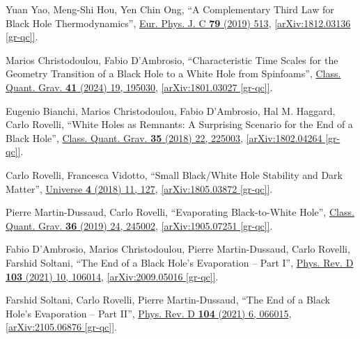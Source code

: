 \documentclass[preprintnumbers, floatfix, preprintnumbers, letterpaper, twocolumn, superscriptaddress,nofootinbib]{revtex4-2}
\begin{document}
\begin{thebibliography}{99}
Yuan Yao, Meng-Shi Hou, Yen Chin Ong, ``A Complementary Third Law for Black Hole Thermodynamics'', 	{\hypersetup{urlcolor=vividviolet}\href{https://link.springer.com/article/10.1140/epjc/s10052-019-7003-1}{Eur. Phys. J. C \textbf{79} (2019) 513}}, \href{https://arxiv.org/abs/1812.03136}{[arXiv:1812.03136 [gr-qc]]}.

Marios Christodoulou, Fabio D'Ambrosio, ``Characteristic Time Scales for the Geometry Transition of a Black Hole to a White Hole from Spinfoams'', {\hypersetup{urlcolor=vividviolet}\href{https://iopscience.iop.org/article/10.1088/1361-6382/ad6059}{Class. Quant. Grav. \textbf{41} (2024) 19, 195030}}, \href{https://arxiv.org/abs/1801.03027}{[arXiv:1801.03027 [gr-qc]]}.

Eugenio Bianchi, Marios Christodoulou, Fabio D'Ambrosio, Hal M. Haggard, Carlo Rovelli, ``White Holes as Remnants: A Surprising Scenario for the End of a Black Hole'', {\hypersetup{urlcolor=vividviolet}\href{https://iopscience.iop.org/article/10.1088/1361-6382/aae550}{Class. Quant. Grav. \textbf{35} (2018) 22, 225003}}, \href{https://arxiv.org/abs/1802.04264}{[arXiv:1802.04264 [gr-qc]]}.

Carlo Rovelli, Francesca Vidotto, ``Small Black/White Hole Stability and Dark Matter'', {\hypersetup{urlcolor=vividviolet}\href{https://www.mdpi.com/2218-1997/4/11/127}{Universe \textbf{4} (2018) 11, 127}}, \href{https://arxiv.org/abs/1805.03872}{[arXiv:1805.03872 [gr-qc]]}.

Pierre Martin-Dussaud, Carlo Rovelli, ``Evaporating Black-to-White Hole'', {\hypersetup{urlcolor=vividviolet}\href{https://iopscience.iop.org/article/10.1088/1361-6382/ab5097}{Class. Quant. Grav. \textbf{36} (2019) 24, 245002}}, \href{https://arxiv.org/abs/1905.07251}{[arXiv:1905.07251 [gr-qc]]}.

Fabio D'Ambrosio, Marios Christodoulou, Pierre Martin-Dussaud, Carlo Rovelli, Farshid Soltani, ``The End of a Black Hole's Evaporation -- Part I'', {\hypersetup{urlcolor=vividviolet}\href{https://journals.aps.org/prd/abstract/10.1103/PhysRevD.103.106014}{Phys. Rev. D \textbf{103} (2021) 10, 106014}}, \href{https://arxiv.org/abs/2009.05016}{[arXiv:2009.05016 [gr-qc]]}.

Farshid Soltani, Carlo Rovelli, Pierre Martin-Dussaud, ``The End of a Black Hole's Evaporation -- Part II'', {\hypersetup{urlcolor=vividviolet}\href{https://journals.aps.org/prd/abstract/10.1103/PhysRevD.104.066015}{Phys. Rev. D \textbf{104} (2021) 6, 066015}}, \href{https://arxiv.org/abs/2105.06876}{[arXiv:2105.06876 [gr-qc]]}.


\end{thebibliography}
\end{document}
